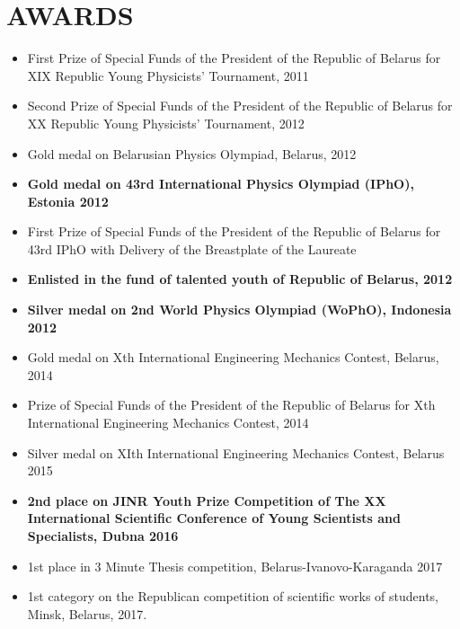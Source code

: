 \documentclass[paper=a4,fontsize=11pt]{scrartcl} %
\newcommand{\NewPart}[1]{\section*{\uppercase{#1}}}
\begin{document}
\NewPart{Awards}{}
\begin{itemize}
\item First Prize of Special Funds of the President of the Republic of Belarus for XIX Republic Young Physicists' Tournament, 2011
\item Second Prize of Special Funds of the President of the Republic of Belarus for XX Republic Young Physicists' Tournament, 2012
\item Gold medal on Belarusian Physics Olympiad, Belarus, 2012
\item \textbf{Gold medal on 43rd International Physics Olympiad (IPhO), Estonia 2012}
\item First Prize of Special Funds of the President of the Republic of Belarus for 43rd IPhO with Delivery of the Breastplate of the Laureate
\item \textbf{Enlisted in the fund of talented youth of Republic of Belarus, 2012}
\item \textbf{Silver medal on 2nd World Physics Olympiad (WoPhO), Indonesia 2012}
\item Gold medal on Xth International Engineering Mechanics Contest, Belarus, 2014
\item Prize of Special Funds of the President of the Republic of Belarus for Xth International Engineering Mechanics Contest, 2014
\item Silver medal on XIth International Engineering Mechanics Contest, Belarus 2015
\item \textbf{2nd place on JINR Youth Prize Competition of The XX International Scientific Conference of Young Scientists and Specialists, Dubna 2016}
\item 1st place in 3 Minute Thesis competition, Belarus-Ivanovo-Karaganda 2017
\item 1st category on the Republican competition of scientific works of students, Minsk, Belarus, 2017.
\end{itemize}
\end{document}
